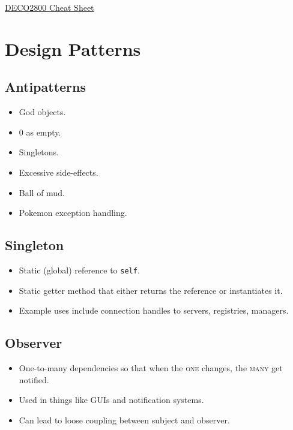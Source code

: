 \documentclass[landscape]{cheat}
\begin{document}
\footnotesize
\begin{multicols*}{3}

\begin{center}
\Large{\underline{DECO2800 Cheat Sheet}} \\
\end{center}

\section{Design Patterns}

\subsection{Antipatterns}
\begin{itemize}
    \item God objects.
    \item 0 as empty.
    \item Singletons.
    \item Excessive side-effects.
    \item Ball of mud.
    \item Pokemon exception handling.
\end{itemize}

\subsection{Singleton}
\begin{itemize}
    \item Static (global) reference to \texttt{self}.
    \item Static getter method that either returns the reference or instantiates it.
    \item Example uses include connection handles to servers, registries, managers.
\end{itemize}

\subsection{Observer}
\begin{itemize}
    \item One-to-many dependencies so that when the \textsc{one} changes, the \textsc{many} get notified.
    \item Used in things like GUIs and notification systems.
    \item Can lead to loose coupling between subject and observer.
\end{itemize}


\end{multicols*}
\end{document}
